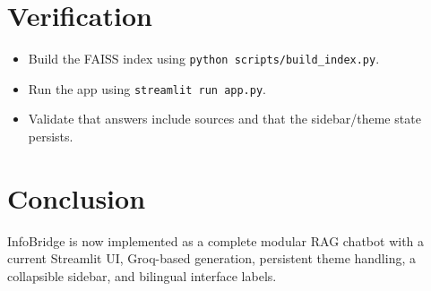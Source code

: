 \documentclass[11pt]{article}
\begin{document}
\section{Verification}
\begin{itemize}
    \item Build the FAISS index using \texttt{python scripts/build\_index.py}.
    \item Run the app using \texttt{streamlit run app.py}.
    \item Validate that answers include sources and that the sidebar/theme state persists.
\end{itemize}

\section{Conclusion}
InfoBridge is now implemented as a complete modular RAG chatbot with a current Streamlit UI, Groq-based generation, persistent theme handling, a collapsible sidebar, and bilingual interface labels.
\end{document}
